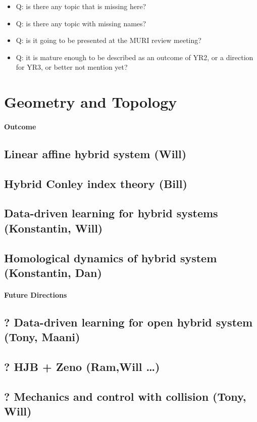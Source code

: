 \documentclass[letterpaper,11pt]{article}
\begin{document}
\newpage

\begin{itemize}
    \item Q: is there any topic that is missing here?
    \item Q: is there any topic with missing names?
    \item Q: is it going to be presented at the MURI review meeting?
    \item Q: it is mature enough to be described as an outcome of YR2, or a direction for YR3, or better not mention yet?
\end{itemize}

\section{Geometry and Topology}
\paragraph*{Outcome}
\subsection{Linear affine hybrid system (Will)}
\subsection{Hybrid Conley index theory (Bill)}
\subsection{Data-driven learning for hybrid systems (Konstantin, Will)}
\subsection{Homological dynamics of hybrid system (Konstantin, Dan)}
\paragraph*{Future Directions}
\subsection{? Data-driven learning for open hybrid system (Tony, Maani)}
\subsection{? HJB + Zeno (Ram,Will …)}
\subsection{? Mechanics and control with collision (Tony, Will)}
\end{document}
